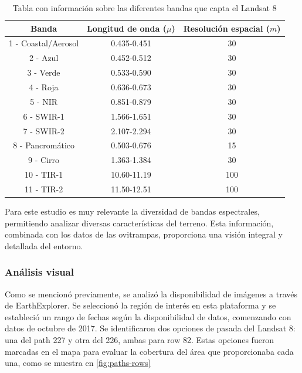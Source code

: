 \begin{table}[H]
\begin{center}
	\begin{tabular}{|c | c | c|} 
		\hline
		\textbf{Banda} & \textbf{Longitud de onda ($\mu$)} & \textbf{Resolución espacial ($m$)}\\
		\hline
		1 - Coastal/Aerosol & 0.435-0.451 & 30 \\
		\hline
		2 - Azul & 0.452-0.512 & 30 \\
		\hline
		3 - Verde& 0.533-0.590 & 30 \\
		\hline
		4 - Roja & 0.636-0.673 & 30 \\
		\hline
		5 - NIR & 0.851-0.879 & 30 \\
		\hline
		6 - SWIR-1 & 1.566-1.651 & 30 \\
		\hline
		7 - SWIR-2 & 2.107-2.294 & 30 \\
		\hline
		8 - Pancromático & 0.503-0.676 & 15 \\
		\hline
		9 - Cirro & 1.363-1.384 & 30 \\
		\hline
		10 - TIR-1 & 10.60-11.19 & 100 \\
		\hline
		11 - TIR-2 & 11.50-12.51 & 100 \\
		\hline
	\end{tabular}
\end{center}
\caption{Tabla con información sobre las diferentes bandas que capta el Landsat 8}
\label{table:landsat}
\end{table}
\singlespacing

Para este estudio es muy relevante la diversidad de bandas espectrales, permitiendo analizar diversas características del terreno. Esta información, combinada con los datos de las ovitrampas, proporciona una visión integral y detallada del entorno.


\subsubsection{Análisis visual}

Como se mencionó previamente, se analizó la disponibilidad de imágenes a través de EarthExplorer. Se seleccionó la región de interés en esta plataforma y se estableció un rango de fechas según la disponibilidad de datos, comenzando con datos de  octubre de 2017. Se identificaron dos opciones de pasada del Landsat 8: una del path 227 y otra del 226, ambas para row 82. Estas opciones fueron marcadas en el mapa para evaluar la cobertura del área que proporcionaba cada una, como se muestra en \figurename \ref{fig:paths-rows}

